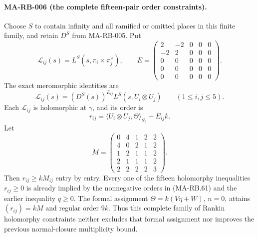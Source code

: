 \paragraph{MA-RB-006 (the complete fifteen-pair order constraints).}
Choose \(S\) to contain infinity and all ramified or omitted
places in this finite family, and retain \(D^S\) from
MA-RB-005. Put
\[
 \mathcal L_{ij}(s)=L^S(s,\pi_i\times\pi_j^\vee),\qquad
 E=\begin{pmatrix}
 2&-2&0&0&0\\
 -2&2&0&0&0\\
 0&0&0&0&0\\
 0&0&0&0&0\\
 0&0&0&0&0
 \end{pmatrix}.
 \tag{MA-RB.62}
\]
The exact meromorphic identities are
\[
          \mathcal L_{ij}(s)
             =(D^S(s))^{E_{ij}}L^S(s,U_i\otimes U_j)
                     \qquad(1\le i,j\le5).
 \tag{MA-RB.63}
\]
Each \(\mathcal L_{ij}\) is holomorphic at \(\gamma\), and
its order is
\[
       r_{ij}
          =\langle U_i\otimes U_j,\Theta\rangle_{S_5}
                       -E_{ij}k .
 \tag{MA-RB.64}
\]
Let
\[
 M=\begin{pmatrix}
 0&4&1&2&2\\
 4&0&2&1&2\\
 1&2&1&1&2\\
 2&1&1&1&2\\
 2&2&2&2&3
 \end{pmatrix}.
 \tag{MA-RB.65}
\]
Then \(r_{ij}\ge kM_{ij}\) entry by entry. Every one of
the fifteen holomorphy inequalities \(r_{ij}\ge0\) is
already implied by the nonnegative orders in (MA-RB.61)
and the earlier inequality \(q\ge0\). The formal
assignment \(\Theta=k(V\eta+W)\), \(n=0\), attains
\((r_{ij})=kM\) and regular order \(9k\).
Thus this complete family of Rankin holomorphy constraints
neither excludes that formal assignment nor improves the
previous normal-closure multiplicity bound.

